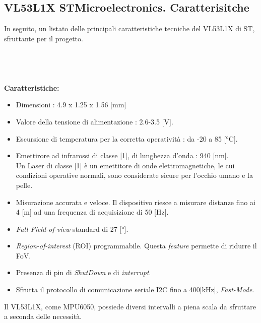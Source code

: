 \documentclass[11pt]{report}
\begin{document}
\subsection{VL53L1X STMicroelectronics. Caratterisitche}
In seguito, un listato delle principali caratteristiche tecniche del VL53L1X di ST, sfruttante per il progetto.\\
\\\\\\\\\textbf{Caratteristiche:}
\begin{itemize}
\item Dimensioni : 4.9 x 1.25 x 1.56 [mm]
\item Valore della tensione di alimentazione : 2.6-3.5 [V].
\item Escursione di temperatura per la corretta operatività : da -20 a 85 [°C].
\item Emettirore ad infrarossi di classe [1], di lunghezza d'onda : 940 [nm]. \\Un Laser di classe [1] è un emettitore di onde elettromagnetiche, le cui condizioni operative normali, sono considerate sicure per l'occhio umano e la pelle.
\item Misurazione accurata e veloce. Il dispositivo riesce a misurare distanze fino ai 4 [m] ad una frequenza di acquisizione di 50 [Hz].
\item \textit{Full Field-of-view} standard di 27 [°].
\item \textit{Region-of-interest} (ROI) programmabile. Questa \textit{feature} permette di ridurre il FoV.
\item Presenza di pin di \textit{ShutDown} e di \textit{interrupt}.
\item Sfrutta il protocollo di comunicazione seriale I2C fino a 400[kHz], \textit{Fast-Mode}.
\end{itemize}
Il VL53L1X, come MPU6050, possiede diversi intervalli a piena scala da sfruttare a seconda delle necessità.
\begin{table}[H]
    \centering
    \caption{\textit{Distance mode} del VL53L1X STMicroelectronics.}
    \label{tab: tabella}
\end{table}
\end{document}
